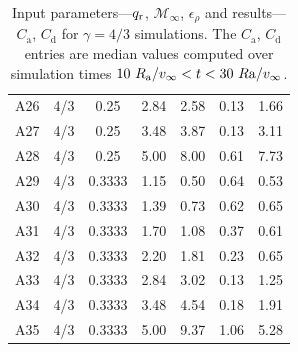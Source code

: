 \begin{table}[t]
{{\begin{tabular}{lcccccc}
A26 & 4/3 & 0.25 & 2.84 & 2.58 & 0.13 & 1.66 \\
A27 & 4/3 & 0.25 & 3.48 & 3.87 & 0.13 & 3.11 \\
A28 & 4/3 & 0.25 & 5.00 & 8.00 & 0.61 & 7.73 \\
A29 & 4/3 & 0.3333 & 1.15 & 0.50 & 0.64 & 0.53 \\
A30 & 4/3 & 0.3333 & 1.39 & 0.73 & 0.62 & 0.65 \\
A31 & 4/3 & 0.3333 & 1.70 & 1.08 & 0.37 & 0.61 \\
A32 & 4/3 & 0.3333 & 2.20 & 1.81 & 0.23 & 0.65 \\
A33 & 4/3 & 0.3333 & 2.84 & 3.02 & 0.13 & 1.25 \\
A34 & 4/3 & 0.3333 & 3.48 & 4.54 & 0.18 & 1.91 \\
A35 & 4/3 & 0.3333 & 5.00 & 9.37 & 1.06 & 5.28 \\
\hline
\end{tabular}
}}
\caption{Input parameters---$q_{\rm r}$, $\mathcal {M}_\infty$, $\epsilon_\rho$ and results---$C_{\mathrm a}$, $C_{\mathrm d}$ for $\gamma = 4/3$ simulations. The $C_\mathrm{a}$, $C_\mathrm{d}$ entries are median values computed over simulation times $10~R_{\rm a} / v_\infty < t < 30~R{\rm a} / v_\infty$.}
\label{tab:sims_43_params}
\end{table}


